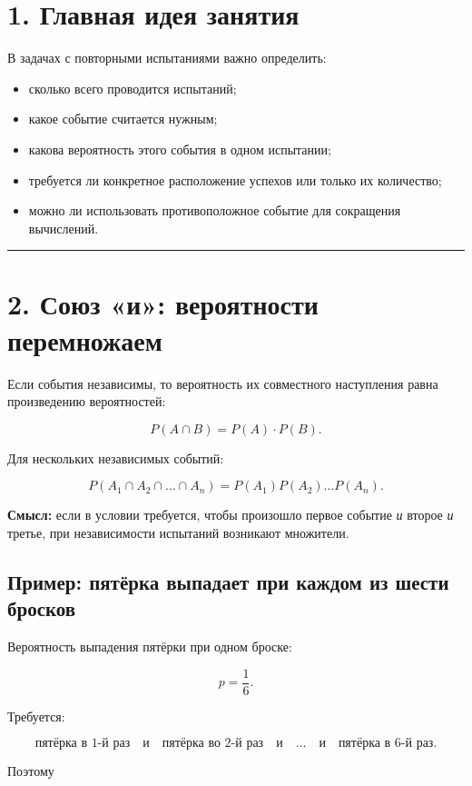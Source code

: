 \documentclass[a4paper,12pt]{article}
\newcommand{\accentline}{%
    \par\noindent
    {\color{accent}\rule{\linewidth}{0.7pt}}
    \par
}
\newcommand{\key}[1]{\textbf{\color{darkaccent}#1}}
\begin{document}
\section*{\color{darkaccent}1. Главная идея занятия}

В задачах с повторными испытаниями важно определить:

\begin{itemize}
    \item сколько всего проводится испытаний;
    \item какое событие считается нужным;
    \item какова вероятность этого события в одном испытании;
    \item требуется ли конкретное расположение успехов или только их количество;
    \item можно ли использовать противоположное событие для сокращения вычислений.
\end{itemize}

\accentline

\section*{\color{darkaccent}2. Союз «и»: вероятности перемножаем}

Если события независимы, то вероятность их совместного наступления равна произведению вероятностей:

\[
P(A\cap B)=P(A)\cdot P(B).
\]

Для нескольких независимых событий:

\[
P(A_1\cap A_2\cap\ldots\cap A_n)
=
P(A_1)P(A_2)\ldots P(A_n).
\]

\key{Смысл:} если в условии требуется, чтобы произошло первое событие \emph{и} второе \emph{и} третье, при независимости испытаний возникают множители.

\subsection*{Пример: пятёрка выпадает при каждом из шести бросков}

Вероятность выпадения пятёрки при одном броске:

\[
p=\frac16.
\]

Требуется:

\[
\text{пятёрка в 1-й раз}
\quad\text{и}\quad
\text{пятёрка во 2-й раз}
\quad\text{и}\quad \ldots
\quad\text{и}\quad
\text{пятёрка в 6-й раз}.
\]

Поэтому
\end{document}
